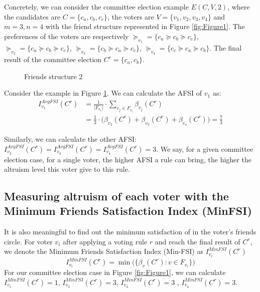 \documentclass{article}
\begin{document}
Concretely, we can consider the committee election example  $E(C,V,2)$,  where the candidates are $ C = \{c_a,c_b,c_c\}$, the voters are $V = \{v_1,v_2,v_3,v_4\}$  and $ m = 3, n = 4$ with the friend structure represented in Figure \ref{fig:Figure1}.  The preferences of the voters are respectively $\succeq_{v_1} =  \{c_a\succeq c_b \succeq c_c\}$,  $\succeq_{v_2} =  \{c_a\succeq c_b \succeq c_c\}$, $\succeq_{v_3} =  \{c_b\succeq c_a \succeq c_c\}$, $\succeq_{v_4} =  \{c_c\succeq c_a \succeq c_b\}$. The final result of the committee election $C^{r}= \{c_a, c_b\}$.

\begin{figure}[h]
\centering
{}
\caption{Friends structure 2} \label{fig:Figure2}
\end{figure} 

Consider the example in Figure  \ref{fig:Figure2}.  We can calculate the AFSI of  $v_1$ as:
\begin{equation*}
    \begin{split}
     I_{v_1}^{AvgFSI}(C^{r}) &= \frac{1}{\vert F_{v_1} \vert}\cdot \sum_{v_j\in {F_{v_i}}}  \beta_{v_j}(C^{r})\\
                 &= \frac{1}{3}\cdot \big(  \beta_{v_2}(C^{r}) +  \beta_{v_3}(C^{r}) +  \beta_{v_4}(C^{r}) \big) =\frac{7}{3}
\end{split}
\end{equation*}

Similarly, we can calculate the other AFSI: $ I_{v_2}^{AvgFSI}(C^{r}) = I_{v_3}^{AvgFSI}(C^{r})=I_{v_4}^{AvgFSI}(C^{r}) = 3$.
We say, for a given committee election case, for a single voter, the higher AFSI a rule can bring, the higher the altruism level this voter give to this rule. 

\subsection{Measuring altruism of each voter with the Minimum Friends Satisfaction Index (MinFSI)}
It is also meaningful to find out the minimum satisfaction of in the voter's friends circle. For voter $v_i$ after applying a voting rule $r$ and reach the final result of $C^{r}$, we denote the Minimum Friends Satisfaction Index (Min-FSI) as $I_{v_i}^{MinFSI}(C^{r})$
\begin{equation}I_{v_i}^{MinFSI}(C^{r}) =  \min \big ( \{ \beta_{v}(C^{r}): v \in F_{v_i}\}  \big)\label{si:MinFSI}
\end{equation}
For our committee election case in Figure   \ref{fig:Figure1}, we can calculate $I_{v_1}^{MinFSI}(C^{r}) = 1$, $I_{v_2}^{MinFSI}(C^{r}) =3$, $I_{v_3}^{MinFSI}(C^{r}) = 3$ , $I_{v_4}^{MinFSI}(C^{r}) =3$.
\end{document}
